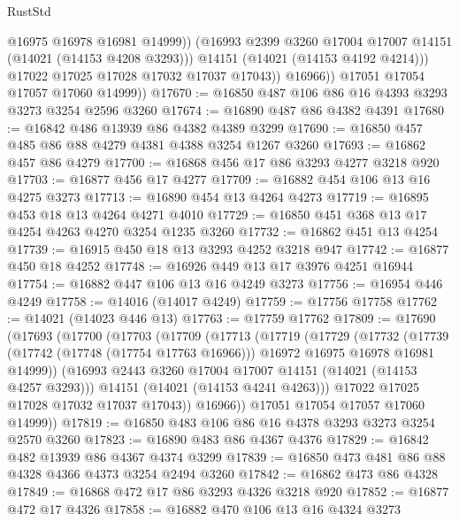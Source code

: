 \begin{lexlean}{RustStd}
\begin{coremodule}
                      @16975
                      @16978
                      @16981
                      @14999))
                  (@16993 @2399 @3260 @17004 @17007 @14151 (@14021 (@14153 @4208 @3293)))
                  @14151
                  (@14021 (@14153 @4192 @4214)))
                @17022
                @17025
                @17028
                @17032
                @17037
                @17043))
            @16966))
        @17051
        @17054
        @17057
        @17060
        @14999))
@17670 := @16850 @487 @106 @86 @16 @4393 @3293 @3273 @3254 @2596 @3260
@17674 := @16890 @487 @86 @4382 @4391
@17680 := @16842 @486 @13939 @86 @4382 @4389 @3299
@17690 := @16850 @457 @485 @86 @88 @4279 @4381 @4388 @3254 @1267 @3260
@17693 := @16862 @457 @86 @4279
@17700 := @16868 @456 @17 @86 @3293 @4277 @3218 @920
@17703 := @16877 @456 @17 @4277
@17709 := @16882 @454 @106 @13 @16 @4275 @3273
@17713 := @16890 @454 @13 @4264 @4273
@17719 := @16895 @453 @18 @13 @4264 @4271 @4010
@17729 := @16850 @451 @368 @13 @17 @4254 @4263 @4270 @3254 @1235 @3260
@17732 := @16862 @451 @13 @4254
@17739 := @16915 @450 @18 @13 @3293 @4252 @3218 @947
@17742 := @16877 @450 @18 @4252
@17748 := @16926 @449 @13 @17 @3976 @4251 @16944
@17754 := @16882 @447 @106 @13 @16 @4249 @3273
@17756 := @16954 @446 @4249
@17758 := @14016 (@14017 @4249)
@17759 := @17756 @17758
@17762 := @14021 (@14023 @446 @13)
@17763 := @17759 @17762
@17809 := @17690
    (@17693
      (@17700
        (@17703
          (@17709
            (@17713
              (@17719
                (@17729
                  (@17732
                    (@17739
                      (@17742 (@17748 (@17754 @17763 @16966)))
                      @16972
                      @16975
                      @16978
                      @16981
                      @14999))
                  (@16993 @2443 @3260 @17004 @17007 @14151 (@14021 (@14153 @4257 @3293)))
                  @14151
                  (@14021 (@14153 @4241 @4263)))
                @17022
                @17025
                @17028
                @17032
                @17037
                @17043))
            @16966))
        @17051
        @17054
        @17057
        @17060
        @14999))
@17819 := @16850 @483 @106 @86 @16 @4378 @3293 @3273 @3254 @2570 @3260
@17823 := @16890 @483 @86 @4367 @4376
@17829 := @16842 @482 @13939 @86 @4367 @4374 @3299
@17839 := @16850 @473 @481 @86 @88 @4328 @4366 @4373 @3254 @2494 @3260
@17842 := @16862 @473 @86 @4328
@17849 := @16868 @472 @17 @86 @3293 @4326 @3218 @920
@17852 := @16877 @472 @17 @4326
@17858 := @16882 @470 @106 @13 @16 @4324 @3273

\end{coremodule}
\end{lexlean}
